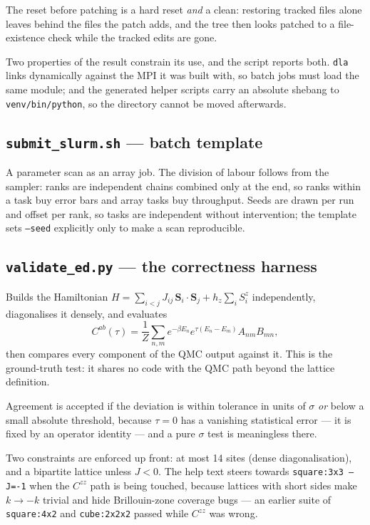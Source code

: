 \documentclass[11pt,a4paper]{article}
\newcommand{\code}[1]{\texttt{#1}}
\newcommand{\file}[1]{\texttt{\textbf{#1}}}
\begin{document}
The reset before patching is a hard reset \emph{and} a clean: restoring tracked
files alone leaves behind the files the patch adds, and the tree then looks
patched to a file-existence check while the tracked edits are gone.

Two properties of the result constrain its use, and the script reports both.
\code{dla} links dynamically against the MPI it was built with, so batch jobs
must load the same module; and the generated helper scripts carry an absolute
shebang to \code{venv/bin/python}, so the directory cannot be moved afterwards.

\subsection{\file{submit\_slurm.sh} --- batch template}

A parameter scan as an array job. The division of labour follows from the
sampler: ranks are independent chains combined only at the end, so ranks within
a task buy error bars and array tasks buy throughput. Seeds are drawn per run
and offset per rank, so tasks are independent without intervention; the template
sets \code{--seed} explicitly only to make a scan reproducible.

\subsection{\file{validate\_ed.py} --- the correctness harness}

Builds the Hamiltonian
$H = \sum_{i<j} J_{ij}\,\mathbf{S}_i\!\cdot\!\mathbf{S}_j + h_z\sum_i S^z_i$
independently, diagonalises it densely, and evaluates
\begin{equation*}
  C^{ab}(\tau) = \frac{1}{Z}\sum_{n,m} e^{-\beta E_n} e^{\tau(E_n - E_m)}
                 A_{nm} B_{mn},
\end{equation*}
then compares every component of the QMC output against it. This is the
ground-truth test: it shares no code with the QMC path beyond the lattice
definition.

Agreement is accepted if the deviation is within tolerance in units of $\sigma$
\emph{or} below a small absolute threshold, because $\tau=0$ has a vanishing
statistical error --- it is fixed by an operator identity --- and a pure
$\sigma$ test is meaningless there.

Two constraints are enforced up front: at most 14 sites (dense diagonalisation),
and a bipartite lattice unless $J<0$. The help text steers towards
\code{square:3x3 --J=-1} when the $C^{zz}$ path is being touched, because
lattices with short sides make $k \to -k$ trivial and hide Brillouin-zone
coverage bugs --- an earlier suite of \code{square:4x2} and \code{cube:2x2x2}
passed while $C^{zz}$ was wrong.
\end{document}
